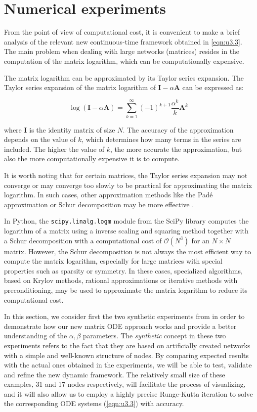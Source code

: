 \chapter{Numerical experiments}
\label{chap:expe}

From the point of view of computational cost, it is convenient to make a brief analysis of the relevant new continuous-time framework obtained in \eqref{eqn:u3.3}. The main problem when dealing with large networks (matrices) resides in the computation of the matrix logarithm, which can be computationally expensive.

The matrix logarithm can be approximated by its Taylor series expansion. The Taylor series expansion of the matrix logarithm of $\mathbf{I} - \alpha \mathbf{A}$ can be expressed as:

$$\log(\mathbf{I} - \alpha \mathbf{A}) = \sum_{k=1}^{\infty} (-1)^{k+1}\frac{\alpha^k}{k}\mathbf{A}^k$$

where $\mathbf{I}$ is the identity matrix of size $N$. The accuracy of the approximation depends on the value of $k$, which determines how many terms in the series are included. The higher the value of $k$, the more accurate the approximation, but also the more computationally expensive it is to compute.

It is worth noting that for certain matrices, the Taylor series expansion may not converge or may converge too slowly to be practical for approximating the matrix logarithm. In such cases, other approximation methods like the Padé approximation or Schur decomposition may be more effective \cite[Ch.\ 11]{higham2008functions}.

In Python, the \texttt{scipy.linalg.logm} module from the SciPy library computes the logarithm of a matrix using a inverse scaling and squaring method together with a Schur decomposition with a computational cost of $\mathcal{O}(N^3)$ for an $N \times N$ matrix. However, the Schur decomposition is not always the most efficient way to compute the matrix logarithm, especially for large matrices with special properties such as sparsity or symmetry. In these cases, specialized algorithms, based on Krylov methods, rational approximations or iterative methods with preconditioning, may be used to approximate the matrix logarithm to reduce its computational cost. 

In this section, we consider first the two synthetic experiments from \cite{grindrod2014dynamical} in order to demonstrate how our new matrix ODE approach works and provide a better understanding of the $\alpha,\beta$ parameters. The \textit{synthetic} concept in these two experiments refers to the fact that they are based on artificially created networks with a simple and well-known structure of nodes. By comparing expected results with the actual ones obtained in the experiments, we will be able to test, validate and refine the new dynamic framework. The relatively small size of these examples, 31 and 17 nodes respectively, will facilitate the process of visualizing, and it will also allow us to employ a highly precise Runge-Kutta iteration to solve the corresponding ODE systems (\ref{eqn:u3.3}) with accuracy.

